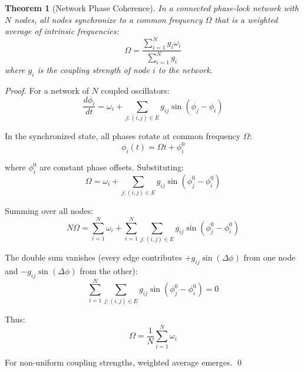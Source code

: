 \documentclass[12pt,a4paper]{article}
\newtheorem{theorem}{Theorem}
\begin{document}
\begin{theorem}[Network Phase Coherence]
\label{thm:network_coherence}
In a connected phase-lock network with $N$ nodes, all nodes synchronize to a common frequency $\Omega$ that is a weighted average of intrinsic frequencies:
\begin{equation}
\Omega = \frac{\sum_{i=1}^{N} g_i \omega_i}{\sum_{i=1}^{N} g_i}
\end{equation}
where $g_i$ is the coupling strength of node $i$ to the network.
\end{theorem}

\begin{proof}
For a network of $N$ coupled oscillators:
\begin{equation}
\frac{d\phi_i}{dt} = \omega_i + \sum_{j:(i,j) \in E} g_{ij} \sin(\phi_j - \phi_i)
\end{equation}

In the synchronized state, all phases rotate at common frequency $\Omega$:
\begin{equation}
\phi_i(t) = \Omega t + \phi_i^0
\end{equation}

where $\phi_i^0$ are constant phase offsets. Substituting:
\begin{equation}
\Omega = \omega_i + \sum_{j:(i,j) \in E} g_{ij} \sin(\phi_j^0 - \phi_i^0)
\end{equation}

Summing over all nodes:
\begin{equation}
N \Omega = \sum_{i=1}^{N} \omega_i + \sum_{i=1}^{N} \sum_{j:(i,j) \in E} g_{ij} \sin(\phi_j^0 - \phi_i^0)
\end{equation}

The double sum vanishes (every edge contributes $+g_{ij} \sin(\Delta\phi)$ from one node and $-g_{ij} \sin(\Delta\phi)$ from the other):
\begin{equation}
\sum_{i=1}^{N} \sum_{j:(i,j) \in E} g_{ij} \sin(\phi_j^0 - \phi_i^0) = 0
\end{equation}

Thus:
\begin{equation}
\Omega = \frac{1}{N} \sum_{i=1}^{N} \omega_i
\end{equation}

For non-uniform coupling strengths, weighted average emerges. \qed
\end{proof}
\end{document}
